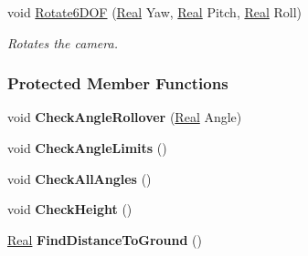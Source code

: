\begin{DoxyCompactItemize}
void \hyperlink{classphys_1_1CameraController_a23d1b811021fc77135a556de86f4f32a}{Rotate6DOF} (\hyperlink{namespacephys_af7eb897198d265b8e868f45240230d5f}{Real} Yaw, \hyperlink{namespacephys_af7eb897198d265b8e868f45240230d5f}{Real} Pitch, \hyperlink{namespacephys_af7eb897198d265b8e868f45240230d5f}{Real} Roll)
\begin{DoxyCompactList}\small\item\em Rotates the camera. \item\end{DoxyCompactList}\end{DoxyCompactItemize}
\subsubsection*{Protected Member Functions}
\begin{DoxyCompactItemize}
\item 
\hypertarget{classphys_1_1CameraController_a2225da030d5a28930c460d0067103274}{
void {\bfseries CheckAngleRollover} (\hyperlink{namespacephys_af7eb897198d265b8e868f45240230d5f}{Real} Angle)}
\label{de/d70/classphys_1_1CameraController_a2225da030d5a28930c460d0067103274}

\item 
\hypertarget{classphys_1_1CameraController_a97de22bfe1e8d98ff2fdde03d38332c9}{
void {\bfseries CheckAngleLimits} ()}
\label{de/d70/classphys_1_1CameraController_a97de22bfe1e8d98ff2fdde03d38332c9}

\item 
\hypertarget{classphys_1_1CameraController_a0a9984ddd68c2a97c52682f90a3008cd}{
void {\bfseries CheckAllAngles} ()}
\label{de/d70/classphys_1_1CameraController_a0a9984ddd68c2a97c52682f90a3008cd}

\item 
\hypertarget{classphys_1_1CameraController_a1ee87ff32c7fcb04ddb65cb9ac1535da}{
void {\bfseries CheckHeight} ()}
\label{de/d70/classphys_1_1CameraController_a1ee87ff32c7fcb04ddb65cb9ac1535da}

\item 
\hypertarget{classphys_1_1CameraController_acadfca85be36af4f631b9427cd8e958a}{
\hyperlink{namespacephys_af7eb897198d265b8e868f45240230d5f}{Real} {\bfseries FindDistanceToGround} ()}
\label{de/d70/classphys_1_1CameraController_acadfca85be36af4f631b9427cd8e958a}

\end{DoxyCompactItemize}
